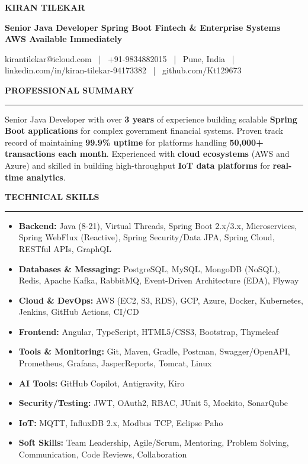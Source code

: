 \documentclass[8pt,a4paper,withhyper]{altacv}
\renewcommand{\cvsectionfont}{\large\rmfamily\bfseries}
\renewcommand{\cvsection}[2][]{%
  \nointerlineskip\bigskip%
  {\color{heading}\cvsectionfont\MakeUppercase{#2}}\\[-1ex]%
  {\color{headingrule}\rule{\linewidth}{1.2pt}\par}\medskip
}
\begin{document}
\begin{center}
{\fontsize{24}{28}\selectfont\color{name}\bfseries\MakeUppercase{Kiran Tilekar}\par}
\vspace{6pt}
{\taglinefont\color{tagline}\textbf{Senior Java Developer \textbar{} Spring Boot \textbar{} Fintech \& Enterprise Systems \textbar{} AWS \textbar{} Available Immediately}\par}
\vspace{4pt}
{\footnotesize kirantilekar@icloud.com ~|~ +91-9834882015 ~|~ Pune, India ~|~ linkedin.com/in/kiran-tilekar-94173382 ~|~ github.com/Kt129673\par}
\end{center}
\medskip

\cvsection{Professional Summary}
\vspace{-2pt}

Senior Java Developer with over \textbf{3 years} of experience building scalable \textbf{Spring Boot applications} for complex government financial systems. Proven track record of maintaining \textbf{99.9\% uptime} for platforms handling \textbf{50,000+ transactions each month}. Experienced with \textbf{cloud ecosystems} (AWS and Azure) and skilled in building high-throughput \textbf{IoT data platforms} for \textbf{real-time analytics}.

\cvsection{Technical Skills}
\vspace{-2pt}

\begin{itemize}[leftmargin=*,itemsep=2pt]
\item \textbf{Backend:} Java (8-21), Virtual Threads, Spring Boot 2.x/3.x, Microservices, Spring WebFlux (Reactive), Spring Security/Data JPA, Spring Cloud, RESTful APIs, GraphQL
\item \textbf{Databases \& Messaging:} PostgreSQL, MySQL, MongoDB (NoSQL), Redis, Apache Kafka, RabbitMQ, Event-Driven Architecture (EDA), Flyway
\item \textbf{Cloud \& DevOps:} AWS (EC2, S3, RDS), GCP, Azure, Docker, Kubernetes, Jenkins, GitHub Actions, CI/CD
\item \textbf{Frontend:} Angular, TypeScript, HTML5/CSS3, Bootstrap, Thymeleaf
\item \textbf{Tools \& Monitoring:} Git, Maven, Gradle, Postman, Swagger/OpenAPI, Prometheus, Grafana, JasperReports, Tomcat, Linux
\item \textbf{AI Tools:} GitHub Copilot, Antigravity, Kiro
\item \textbf{Security/Testing:} JWT, OAuth2, RBAC, JUnit 5, Mockito, SonarQube
\item \textbf{IoT:} MQTT, InfluxDB 2.x, Modbus TCP, Eclipse Paho
\item \textbf{Soft Skills:} Team Leadership, Agile/Scrum, Mentoring, Problem Solving, Communication, Code Reviews, Collaboration
\end{itemize}
\end{document}
